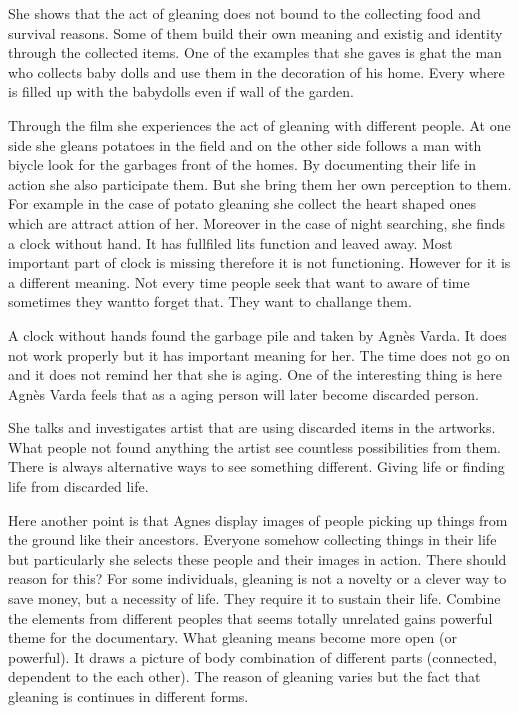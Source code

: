 
She shows that the act of gleaning does not bound to the collecting food and survival reasons. Some of them build their own meaning and existig and identity through the collected items. One of the examples that she gaves is ghat the man who collects baby dolls and use them in the decoration of his home. Every where is filled up with the babydolls even if wall of the garden.

Through the film she experiences the act of gleaning with different people. At one side she gleans potatoes in the field and on the other side follows a man with biycle look for the garbages front of the homes. By documenting their life in action she also participate them. But she bring them her own perception to them. For example in the case of potato gleaning she collect the heart shaped ones which are attract attion of her. Moreover in the case of night searching, she finds a clock without hand. It has fullfiled lits function and leaved away. Most important part of clock is missing therefore it is not functioning. However for it is a different meaning. Not every time people seek that want to aware of time sometimes they wantto forget that. They want to challange them.

A clock without hands found the garbage pile and taken by Agnès Varda. It does not work properly but it has important meaning for her. The time does not go on and it does not remind her that she is aging. One of the interesting thing is here Agnès Varda feels that as a aging person will later become discarded person.

She talks and investigates artist that are using discarded items in the artworks. What people not found anything the artist see countless possibilities from them. There is always alternative ways to see something different. Giving life or finding life from discarded life. 

Here another point is that Agnes display images of people picking up things from the ground like their ancestors. Everyone somehow collecting things in their life but particularly she selects these people and their images in action. There should reason for this? For some individuals, gleaning is not a novelty or a clever way to save money, but a necessity of life. They require it to sustain their life. Combine the elements from different peoples that seems totally unrelated gains powerful theme for the documentary. What gleaning means become more open (or powerful). It draws a picture of body combination of different parts (connected, dependent to the each other). The reason of gleaning varies but the fact that gleaning is continues in different forms.

